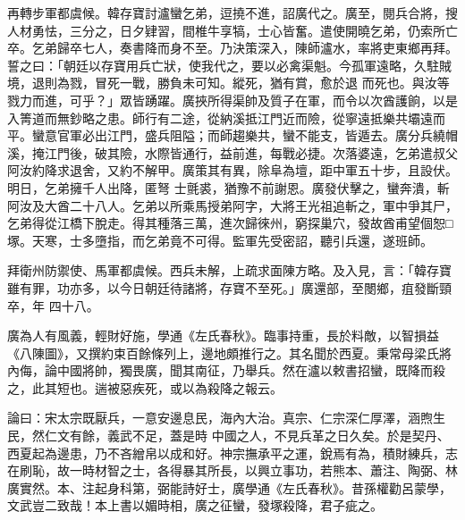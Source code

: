 \begin{pinyinscope}
 再轉步軍都虞候。韓存寶討瀘蠻乞弟，逗撓不進，詔廣代之。廣至，閱兵合將，搜人材勇怯，三分之，日夕肄習，間椎牛享犒，士心皆奮。遣使開曉乞弟，仍索所亡卒。乞弟歸卒七人，奏書降而身不至。乃決策深入，陳師瀘水，率將吏東鄉再拜。誓之曰：「朝廷以存寶用兵亡狀，使我代之，要以必禽渠魁。今孤軍遠略，久駐賊境，退則為戮，冒死一戰，勝負未可知。縱死，猶有賞，愈於退
 而死也。與汝等戮力而進，可乎？」眾皆踴躍。廣挾所得渠帥及質子在軍，而令以次酋護餉，以是入箐道而無鈔略之患。師行有二途，從納溪抵江門近而險，從寧遠抵樂共壩遠而平。蠻意官軍必出江門，盛兵阻隘；而師趨樂共，蠻不能支，皆遁去。廣分兵繞帽溪，掩江門後，破其險，水際皆通行，益前進，每戰必捷。次落婆遠，乞弟遣叔父阿汝約降求退舍，又約不解甲。廣策其有異，除阜為壇，距中軍五十步，且設伏。明日，乞弟擁千人出降，匿弩
 士氈裘，猶豫不前謝恩。廣發伏擊之，蠻奔潰，斬阿汝及大酋二十八人。乞弟以所乘馬授弟阿字，大將王光祖追斬之，軍中爭其尸，乞弟得從江橋下脫走。得其種落三萬，進次歸徠州，窮探巢穴，發故酋甫望個恕□塚。天寒，士多墮指，而乞弟竟不可得。監軍先受密詔，聽引兵還，遂班師。



 拜衛州防禦使、馬軍都虞候。西兵未解，上疏求面陳方略。及入見，言：「韓存寶雖有罪，功亦多，以今日朝廷待諸將，存寶不至死。」廣還部，至閿鄉，疽發斷頸卒，年
 四十八。



 廣為人有風義，輕財好施，學通《左氏春秋》。臨事持重，長於料敵，以智損益《八陳圖》，又撰約束百餘條列上，邊地頗推行之。其名聞於西夏。秉常母梁氏將內侮，論中國將帥，獨畏廣，聞其南征，乃舉兵。然在瀘以敕書招蠻，既降而殺之，此其短也。遄被惡疾死，或以為殺降之報云。



 論曰：宋太宗既厭兵，一意安邊息民，海內大治。真宗、仁宗深仁厚澤，涵煦生民，然仁文有餘，義武不足，蓋是時
 中國之人，不見兵革之日久矣。於是契丹、西夏起為邊患，乃不吝繒帛以成和好。神宗撫承平之運，銳焉有為，積財練兵，志在刷恥，故一時材智之士，各得暴其所長，以興立事功，若熊本、蕭注、陶弼、林廣實然。本、注起身科第，弼能詩好士，廣學通《左氏春秋》。昔孫權勸呂蒙學，文武豈二致哉！本上書以媚時相，廣之征蠻，發塚殺降，君子疵之。



\end{pinyinscope}